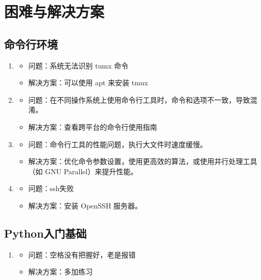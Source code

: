 \documentclass[UTF8]{ctexart}
\begin{document}
 \section{困难与解决方案} \subsection{命令行环境}

\begin{enumerate} \item \begin{itemize} \item 问题：系统无法识别 tumx 命令 \item 解决方案：可以使用 apt 来安装 tmux \end{itemize}\item \begin{itemize} \item 问题：在不同操作系统上使用命令行工具时，命令和选项不一致，导致混淆。 \item 解决方案：查看跨平台的命令行使用指南 \end{itemize} \item \begin{itemize} \item 问题：命令行工具的性能问题，执行大文件时速度缓慢。 \item 解决方案：优化命令参数设置，使用更高效的算法，或使用并行处理工具（如 GNU Parallel）来提升性能。 \end{itemize} \item \begin{itemize} \item 问题：ssh失败 \item 解决方案：安装 OpenSSH 服务器。 \end{itemize}  \end{enumerate}

\subsection{Python入门基础} \begin{enumerate} \item \begin{itemize} \item 问题：空格没有把握好，老是报错 \item 解决方案：多加练习 \end{itemize} \end{enumerate}
\end{document}
